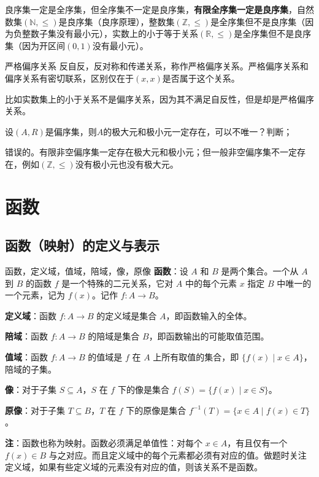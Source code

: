 \documentclass[lang=cn,11pt]{elegantbook}
\begin{document}
良序集一定是全序集，但全序集不一定是良序集，\textbf{有限全序集一定是良序集}，自然数集$(\mathbb{N}, \leq)$是良序集（良序原理），整数集$(\mathbb{Z}, \leq)$是全序集但不是良序集（因为负整数子集没有最小元），实数上的小于等于关系$(\mathbb{R}, \leq)$是全序集但不是良序集（因为开区间$(0,1)$没有最小元）。
\begin{definition}{严格偏序关系}
    反自反，反对称和传递关系，称作严格偏序关系。严格偏序关系和偏序关系有密切联系，区别仅在于$(x,x)$是否属于这个关系。
\end{definition}
比如实数集上的小于关系不是偏序关系，因为其不满足自反性，但是却是严格偏序关系。
\begin{example}
设$(A,R)$是偏序集，则$A$的极大元和极小元一定存在，可以不唯一？判断；
\end{example}
错误的。有限非空偏序集一定存在极大元和极小元；但一般非空偏序集不一定存在，例如$(\mathbb{Z},\leqslant)$没有极小元也没有极大元。


\chapter{函数}
\section{函数（映射）的定义与表示}
\begin{definition}{函数，定义域，值域，陪域，像，原像}
\textbf{函数}：设 $A$ 和 $B$ 是两个集合。一个从 $A$ 到 $B$ 的函数 $f$ 是一个特殊的二元关系，它对 $A$ 中的每个元素 $x$ 指定 $B$ 中唯一的一个元素，记为 $f(x)$。记作 $f: A \to B$。

\textbf{定义域}：函数 $f: A \to B$ 的定义域是集合 $A$，即函数输入的全体。

\textbf{陪域}：函数 $f: A \to B$ 的陪域是集合 $B$，即函数输出的可能取值范围。

\textbf{值域}：函数 $f: A \to B$ 的值域是 $f$ 在 $A$ 上所有取值的集合，即 $\{f(x) \mid x \in A\}$，陪域的子集。

\textbf{像}：对于子集 $S \subseteq A$，$S$ 在 $f$ 下的像是集合 $f(S) = \{f(x) \mid x \in S\}$。

\textbf{原像}：对于子集 $T \subseteq B$，$T$ 在 $f$ 下的原像是集合 $f^{-1}(T) = \{x \in A \mid f(x) \in T\}$。
\end{definition}
\textbf{注}：函数也称为映射。函数必须满足单值性：对每个 $x \in A$，有且仅有一个 $f(x) \in B$ 与之对应。而且定义域中的每个元素都必须有对应的值。做题时关注定义域，如果有些定义域的元素没有对应的值，则该关系不是函数。
\end{document}
